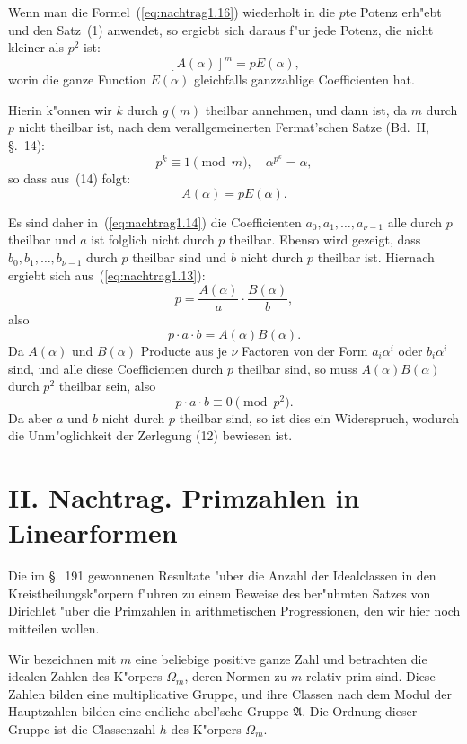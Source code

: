 \documentclass[10pt,a4paper]{article}
\theoremstyle{weberstyle}
\begin{document}
Wenn man die Formel~(\ref{eq:nachtrag1.16}) wiederholt in die $p$te
Potenz erh"ebt und den Satz~(1) anwendet, so ergiebt sich daraus f"ur
jede Potenz, die nicht kleiner als $p^2$ ist:
\begin{equation}\label{eq:nachtrag1.17}
[A(\alpha)]^m = pE(\alpha),
\end{equation}
worin die ganze Function $E(\alpha)$ gleichfalls ganzzahlige Coefficienten
hat.

Hierin k"onnen wir $k$ durch $g(m)$ theilbar annehmen, und dann ist, da
$m$ durch $p$ nicht theilbar ist, nach dem verallgemeinerten Fermat'schen
Satze (Bd.~II, \S.~14):
\[
p^k\equiv 1\pmod{m},\quad \alpha^{p^k}=\alpha,
\]
so dass aus~(14) folgt:
\begin{equation}\label{eq:nachtrag1.18}
A(\alpha) = pE(\alpha).
\end{equation}

Es sind daher in~(\ref{eq:nachtrag1.14}) die Coefficienten
$a_0,a_1,\dots,a_{\nu-1}$ alle durch $p$ theilbar und $a$ ist folglich
nicht durch $p$ theilbar. Ebenso wird gezeigt, dass
$b_0,b_1,\dots,b_{\nu-1}$ durch $p$ theilbar sind und $b$ nicht durch $p$
theilbar ist. Hiernach ergiebt sich aus~(\ref{eq:nachtrag1.13}):
\[
p = \frac{A(\alpha)}{a}\cdot\frac{B(\alpha)}{b},
\]
also
\[
p\cdot a\cdot b = A(\alpha)B(\alpha).
\]
Da $A(\alpha)$ und $B(\alpha)$ Producte aus je $\nu$ Factoren von der Form
$a_i\alpha^i$ oder $b_i\alpha^i$ sind, und alle diese Coefficienten durch
$p$ theilbar sind, so muss $A(\alpha)B(\alpha)$ durch $p^2$ theilbar sein,
also
\[
p\cdot a\cdot b \equiv 0\pmod{p^2}.
\]
Da aber $a$ und $b$ nicht durch $p$ theilbar sind, so ist dies ein
Widerspruch, wodurch die Unm"oglichkeit der Zerlegung
(12) bewiesen ist.

\newpage

%
%
\section*{II. Nachtrag. Primzahlen in Linearformen}

Die im \S.~191 gewonnenen Resultate "uber die Anzahl der Idealclassen in
den Kreistheilungsk"orpern f"uhren zu einem Beweise des ber"uhmten Satzes
von Dirichlet "uber die Primzahlen in arithmetischen Progressionen, den
wir hier noch mitteilen wollen.

Wir bezeichnen mit $m$ eine beliebige positive ganze Zahl und betrachten
die idealen Zahlen des K"orpers $\Omega_m$, deren Normen zu $m$ relativ
prim sind. Diese Zahlen bilden eine multiplicative Gruppe, und ihre
Classen nach dem Modul der Hauptzahlen bilden eine endliche abel'sche
Gruppe $\mathfrak{A}$. Die Ordnung dieser Gruppe ist die Classenzahl $h$
des K"orpers $\Omega_m$.
\end{document}

